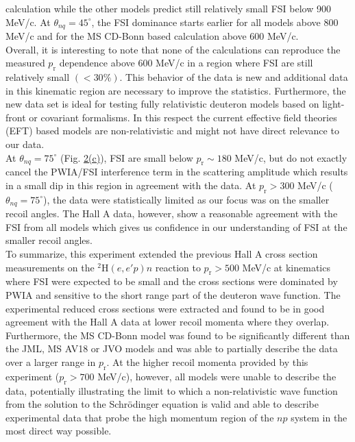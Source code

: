 \documentclass[aps,prl,twocolumn,showpacs,superscriptaddress,groupedaddress]{revtex4-2}  %
\begin{document}
calculation while the other models predict still relatively small FSI below 900 MeV/c.
At $\theta_{nq}=45^{\circ}$, the FSI dominance starts earlier for all models above 800 MeV/c and for the MS CD-Bonn based calculation above 600 MeV/c. \\
\indent Overall, it is interesting to note that none of the calculations can reproduce the measured $p_{\mathrm{r}}$ dependence above 600 MeV/c in a
region where FSI are still relatively small $(<30\%)$. This behavior of the data is new and additional data in this kinematic region are necessary
to improve the statistics. Furthermore, the new data set is ideal for testing fully relativistic deuteron models based on light-front or covariant formalisms.
In this respect the current effective field theories (EFT) based models \cite{Reinert_EFT2018} are non-relativistic and might not have direct relevance to our data. \\
\indent At $\theta_{nq}=75^{\circ}$ (Fig. \hyperref[fig:fig2]{2(c)}), FSI are small below $p_{\mathrm{r}}\sim180$ MeV/c, but do not exactly cancel the PWIA/FSI interference term in the scattering amplitude which results in a small dip in this region in agreement with the data.
At $p_{\mathrm{r}}>300$ MeV/c ($\theta_{nq}=75^{\circ}$), the data were statistically limited as our focus was on the smaller recoil angles. The Hall A data, however, show a reasonable agreement with the FSI from all models
which gives us confidence in our understanding of FSI at the smaller recoil angles. \\
\indent To summarize, this experiment extended the previous Hall A cross section measurements on the $^{2}\mathrm{H}(e,e'p)n$ reaction to 
$p_{\mathrm{r}}>500$ MeV/c at kinematics where FSI were expected to be small and the cross sections were dominated by PWIA and sensitive to the
short range part of the deuteron wave function. The experimental reduced cross sections were extracted and found to be in good agreement with the Hall A data at lower recoil momenta where they overlap.
Furthermore, the MS CD-Bonn model was found to be significantly different than the JML, MS AV18 or JVO models and was able to partially describe the data over a larger range in $p_{\mathrm{r}}$.
At the higher recoil momenta provided by this experiment ($p_{\mathrm{r}}>700$ MeV/c), however, all models were unable to describe the data,
potentially illustrating the limit to which a non-relativistic wave function from the solution to the Schr\"{o}dinger equation is valid and able to describe
experimental data that probe the high momentum region of the $np$ system in the most direct way possible.
\end{document}
